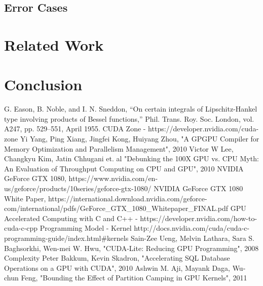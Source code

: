 \documentclass[conference]{IEEEtran}
\begin{document}
	
	\subsection{Error Cases}
	
	
\section{Related Work}

\section{Conclusion}
	

\begin{thebibliography}{00}
 G. Eason, B. Noble, and I. N. Sneddon, ``On certain integrals of Lipschitz-Hankel type involving products of Bessel functions,'' Phil. Trans. Roy. Soc. London, vol. A247, pp. 529--551, April 1955.
 CUDA Zone - https://developer.nvidia.com/cuda-zone
 Yi Yang, Ping Xiang, Jingfei Kong, Huiyang Zhou, "A GPGPU Compiler for Memory Optimization and Parallelism Management", 2010
 Victor W Lee, Changkyu Kim, Jatin Chhugani et. al "Debunking the 100X GPU vs. CPU Myth: An Evaluation of Throughput Computing on CPU and GPU", 2010
 NVIDIA GeForce GTX 1080, https://www.nvidia.com/en-us/geforce/products/10series/geforce-gtx-1080/
 NVIDIA GeForce GTX 1080 White Paper,
https://international.download.nvidia.com/geforce-com/international/pdfs/GeForce\_GTX\_1080\_Whitepaper\_FINAL.pdf
 GPU Accelerated Computing with C and C++ - https://developer.nvidia.com/how-to-cuda-c-cpp
 Programming Model - Kernel http://docs.nvidia.com/cuda/cuda-c-programming-guide/index.html\#kernels
 Sain-Zee Ueng, Melvin Lathara, Sara S. Baghsorkhi, Wen-mei W. Hwu, "CUDA-Lite: Reducing GPU Programming", 2008
Complexity
 Peter Bakkum, Kevin Skadron, "Accelerating SQL Database Operations on a GPU with CUDA", 2010
 Ashwin M. Aji, Mayank Daga, Wu-chun Feng, "Bounding the Effect of Partition Camping in GPU Kernels", 2011


\end{thebibliography}
\end{document}
